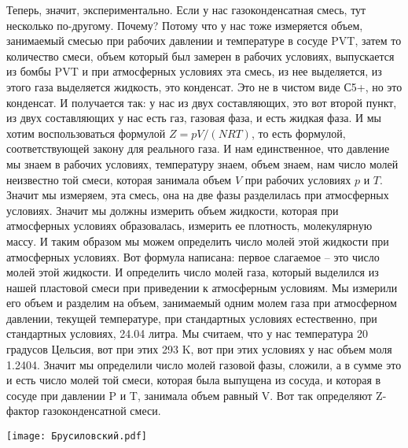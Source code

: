\documentclass[main.tex]{subfiles}
\begin{document}
Теперь, значит, экспериментально.
Если у нас газоконденсатная смесь, тут несколько по-другому.
Почему?
Потому что у нас тоже измеряется объем, занимаемый смесью при рабочих давлении и температуре в сосуде PVT, затем то количество смеси, объем который был замерен в рабочих условиях, выпускается из бомбы PVT и при атмосферных условиях эта смесь, из нее выделяется, из этого газа выделяется жидкость, это конденсат.
Это не в чистом виде С5+, но это конденсат.
И получается так: у нас из двух составляющих, это вот второй пункт, из двух составляющих у нас есть газ, газовая фаза, и есть жидкая фаза.
И мы хотим воспользоваться формулой $Z=pV/(NRT)$, то есть формулой, соответствующей закону для реального газа.
И нам единственное, что давление мы знаем в рабочих условиях, температуру знаем, объем знаем, нам число молей неизвестно той смеси, которая занимала объем $V$ при рабочих условиях $p$ и $T$.
Значит мы измеряем, эта смесь, она на две фазы разделилась при атмосферных условиях.
Значит мы должны измерить объем жидкости, которая при атмосферных условиях образовалась, измерить ее плотность, молекулярную массу.
И таким образом мы можем определить число молей этой жидкости при атмосферных условиях.
Вот формула написана: первое слагаемое -- это число молей этой жидкости.
И определить число молей газа, который выделился из нашей пластовой смеси при приведении к атмосферным условиям.
Мы измерили его объем и разделим на объем, занимаемый одним молем газа при атмосферном давлении, текущей температуре, при стандартных условиях естественно, при стандартных условиях, 24.04 литра.
Мы считаем, что у нас температура 20 градусов Цельсия, вот при этих 293 K, вот при этих условиях у нас объем моля 1.2404.
Значит мы определили число молей газовой фазы, сложили, а в сумме это и есть число молей той смеси, которая была выпущена из сосуда, и которая в сосуде при давлении P и T, занимала объем равный V.
Вот так определяют Z-фактор газоконденсатной смеси.

\begin{center}
\texttt{[image: Брусиловский.pdf]}
\end{center}
\end{document}
